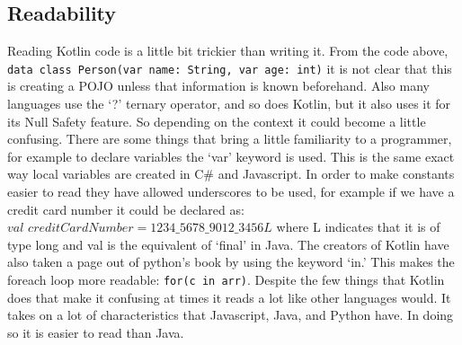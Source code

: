 \subsection{Readability}
\hspace{1em}Reading Kotlin code is a little bit trickier than writing it. From the code above, \texttt{data class Person(var name: String, var age: int)} it is not clear that this is creating a POJO unless that information is known beforehand. Also many languages use the `?' ternary operator, and so does Kotlin, but it also uses it for its Null Safety feature. So depending on the context it could become a little confusing. There are some things that bring a little familiarity to a programmer, for example to declare variables the `var' keyword is used. This is the same exact way local variables are created in C\# and Javascript. In order to make constants easier to read they have allowed underscores to be used, for example if we have a credit card number it could be declared as: \\$val$ $creditCardNumber = 1234\_5678\_9012\_3456L$ where L indicates that it is of type long and val is the equivalent of `final' in Java. The creators of Kotlin have also taken a page out of python's book by using the keyword `in.' This makes the foreach loop more readable: \texttt{for(c in arr)}. Despite the few things that Kotlin does that make it confusing at times it reads a lot like other languages would. It takes on a lot of characteristics that Javascript, Java, and Python have. In doing so it is easier to read than Java.


